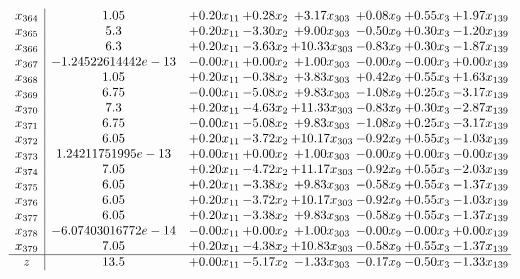 \documentclass[8pt]{article}
\begin{document}
\[\begin{array}{c| c c@{\hskip 2pt} c@{\hskip 2pt} c@{\hskip 2pt} c@{\hskip 2pt} c@{\hskip 2pt} c@{\hskip 2pt} }
 x_{364}   &  1.05 & +  0.20 x_{11} & +  0.28 x_{2} & +  3.17 x_{303} & +  0.08 x_{9} & +  0.55 x_{3} & +  1.97 x_{139}\\
 x_{365}   &  5.3 & +  0.20 x_{11} & -3.30 x_{2} & +  9.00 x_{303} & -0.50 x_{9} & +  0.30 x_{3} & -1.20 x_{139}\\
 x_{366}   &  6.3 & +  0.20 x_{11} & -3.63 x_{2} & + 10.33 x_{303} & -0.83 x_{9} & +  0.30 x_{3} & -1.87 x_{139}\\
 x_{367}   &  -1.24522614442e-13 & -0.00 x_{11} & +  0.00 x_{2} & +  1.00 x_{303} & -0.00 x_{9} & -0.00 x_{3} & +  0.00 x_{139}\\
 x_{368}   &  1.05 & +  0.20 x_{11} & -0.38 x_{2} & +  3.83 x_{303} & +  0.42 x_{9} & +  0.55 x_{3} & +  1.63 x_{139}\\
 x_{369}   &  6.75 & -0.00 x_{11} & -5.08 x_{2} & +  9.83 x_{303} & -1.08 x_{9} & +  0.25 x_{3} & -3.17 x_{139}\\
 x_{370}   &  7.3 & +  0.20 x_{11} & -4.63 x_{2} & + 11.33 x_{303} & -0.83 x_{9} & +  0.30 x_{3} & -2.87 x_{139}\\
 x_{371}   &  6.75 & -0.00 x_{11} & -5.08 x_{2} & +  9.83 x_{303} & -1.08 x_{9} & +  0.25 x_{3} & -3.17 x_{139}\\
 x_{372}   &  6.05 & +  0.20 x_{11} & -3.72 x_{2} & + 10.17 x_{303} & -0.92 x_{9} & +  0.55 x_{3} & -1.03 x_{139}\\
 x_{373}   &  1.24211751995e-13 & +  0.00 x_{11} & +  0.00 x_{2} & +  1.00 x_{303} & -0.00 x_{9} & +  0.00 x_{3} & -0.00 x_{139}\\
 x_{374}   &  7.05 & +  0.20 x_{11} & -4.72 x_{2} & + 11.17 x_{303} & -0.92 x_{9} & +  0.55 x_{3} & -2.03 x_{139}\\
 x_{375}   &  6.05 & +  0.20 x_{11} & -3.38 x_{2} & +  9.83 x_{303} & -0.58 x_{9} & +  0.55 x_{3} & -1.37 x_{139}\\
 x_{376}   &  6.05 & +  0.20 x_{11} & -3.72 x_{2} & + 10.17 x_{303} & -0.92 x_{9} & +  0.55 x_{3} & -1.03 x_{139}\\
 x_{377}   &  6.05 & +  0.20 x_{11} & -3.38 x_{2} & +  9.83 x_{303} & -0.58 x_{9} & +  0.55 x_{3} & -1.37 x_{139}\\
 x_{378}   &  -6.07403016772e-14 & -0.00 x_{11} & +  0.00 x_{2} & +  1.00 x_{303} & -0.00 x_{9} & -0.00 x_{3} & +  0.00 x_{139}\\
 x_{379}   &  7.05 & +  0.20 x_{11} & -4.38 x_{2} & + 10.83 x_{303} & -0.58 x_{9} & +  0.55 x_{3} & -1.37 x_{139}\\
\hline
z    &  13.5 & +  0.00 x_{11} & -5.17 x_{2} & -1.33 x_{303} & -0.17 x_{9} & -0.50 x_{3} & -1.33 x_{139}\\
\end{array}\]
\end{document}
